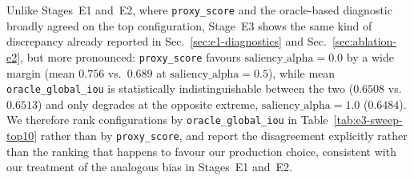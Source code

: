 
Unlike Stages~E1 and~E2, where \texttt{proxy\_score} and the oracle-based
diagnostic broadly agreed on the top configuration, Stage~E3 shows the same
kind of discrepancy already reported in Sec.~\ref{sec:e1-diagnostics} and
Sec.~\ref{sec:ablation-e2}, but more pronounced: \texttt{proxy\_score}
favours $\text{saliency\_alpha}=0.0$ by a wide margin (mean $0.756$ vs.\
$0.689$ at $\text{saliency\_alpha}=0.5$), while mean \texttt{oracle\_global\_iou}
is statistically indistinguishable between the two ($0.6508$ vs.\ $0.6513$)
and only degrades at the opposite extreme, $\text{saliency\_alpha}=1.0$
($0.6484$). We therefore rank configurations by \texttt{oracle\_global\_iou}
in Table~\ref{tab:e3-sweep-top10} rather than by \texttt{proxy\_score}, and
report the disagreement explicitly rather than the ranking that happens to
favour our production choice, consistent with our treatment of the analogous
bias in Stages~E1 and~E2.

